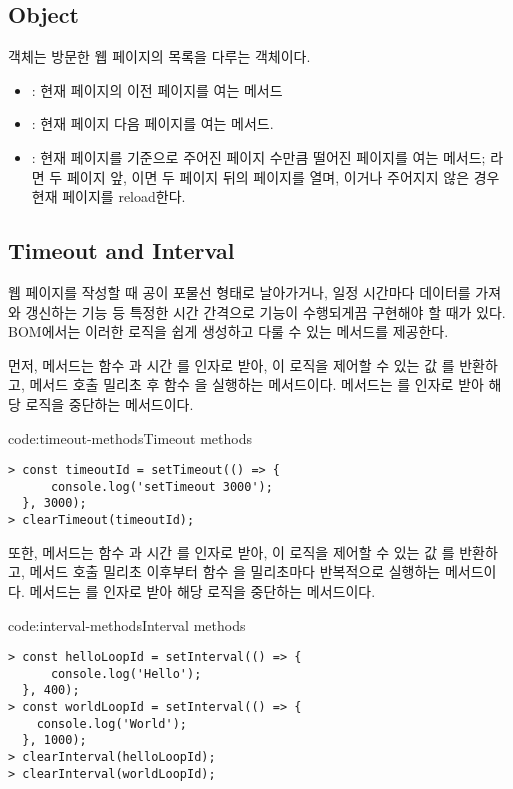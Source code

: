 \subsection*{ Object}

 객체는 방문한 웹 페이지의 목록을 다루는 객체이다.

\begin{itemize}
    \item {}: 현재 페이지의 이전 페이지를 여는 메서드
    \item {}: 현재 페이지 다음 페이지를 여는 메서드.
    \item {}: 현재 페이지를 기준으로 주어진 페이지 수만큼 떨어진 페이지를 여는 메서드; 라면 두 페이지 앞, 이면 두 페이지 뒤의 페이지를 열며, 이거나 주어지지 않은 경우 현재 페이지를 reload한다.
\end{itemize}

\subsection*{Timeout and Interval}

웹 페이지를 작성할 때 공이 포물선 형태로 날아가거나, 일정 시간마다 데이터를 가져와 갱신하는 기능 등 특정한 시간 간격으로 기능이 수행되게끔 구현해야 할 때가 있다. BOM에서는 이러한 로직을 쉽게 생성하고 다룰 수 있는 메서드를 제공한다.

먼저,  메서드는 함수 과 시간 를 인자로 받아, 이 로직을 제어할 수 있는 값 를 반환하고, 메서드 호출  밀리초 후 함수 을 실행하는 메서드이다.  메서드는 를 인자로 받아 해당 로직을 중단하는 메서드이다.

\begin{codeenv}{code:timeout-methods}{Timeout methods}\begin{verbatim}
> const timeoutId = setTimeout(() => {
      console.log('setTimeout 3000');
  }, 3000);
> clearTimeout(timeoutId);
\end{verbatim}
\end{codeenv}

또한,  메서드는 함수 과 시간 를 인자로 받아, 이 로직을 제어할 수 있는 값 를 반환하고, 메서드 호출  밀리초 이후부터 함수 을  밀리초마다 반복적으로 실행하는 메서드이다.  메서드는 를 인자로 받아 해당 로직을 중단하는 메서드이다.

\begin{codeenv}{code:interval-methods}{Interval methods}\begin{verbatim}
> const helloLoopId = setInterval(() => {
      console.log('Hello');
  }, 400);
> const worldLoopId = setInterval(() => {
    console.log('World');
  }, 1000);
> clearInterval(helloLoopId);
> clearInterval(worldLoopId);
\end{verbatim}
\end{codeenv}

